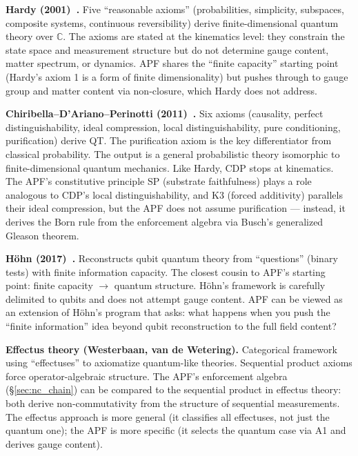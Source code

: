 \documentclass[11pt,a4paper]{article}
\theoremstyle{definition}
\begin{document}
\smallskip\noindent\textbf{Hardy (2001)~\cite{Hardy2001}.}\quad
Five ``reasonable axioms'' (probabilities, simplicity, subspaces,
composite systems, continuous reversibility) derive finite-dimensional
quantum theory over $\mathbb{C}$.  The axioms are stated at the
kinematics level: they constrain the state space and measurement
structure but do not determine gauge content, matter spectrum, or
dynamics.  APF shares the ``finite capacity'' starting point
(Hardy's axiom 1 is a form of finite dimensionality) but pushes
through to gauge group and matter content via non-closure, which
Hardy does not address.

\smallskip\noindent\textbf{Chiribella--D'Ariano--Perinotti
(2011)~\cite{CDP2011}.}\quad
Six axioms (causality, perfect distinguishability, ideal compression,
local distinguishability, pure conditioning, purification) derive QT.
The purification axiom is the key differentiator from classical
probability.  The output is a general probabilistic theory isomorphic
to finite-dimensional quantum mechanics.  Like Hardy, CDP stops at
kinematics.  The APF's constitutive principle SP (substrate faithfulness)
plays a role analogous to CDP's local distinguishability, and K3
(forced additivity) parallels their ideal compression, but the APF
does not assume purification --- instead, it derives the Born rule
from the enforcement algebra via Busch's generalized Gleason theorem.

\smallskip\noindent\textbf{H\"ohn (2017)~\cite{Hohn2017}.}\quad
Reconstructs qubit quantum theory from ``questions'' (binary tests)
with finite information capacity.  The closest cousin to APF's
starting point: finite capacity $\to$ quantum structure.  H\"ohn's
framework is carefully delimited to qubits and does not attempt gauge
content.  APF can be viewed as an extension of H\"ohn's program that
asks: what happens when you push the ``finite information'' idea beyond
qubit reconstruction to the full field content?

\smallskip\noindent\textbf{Effectus theory (Westerbaan, van de Wetering).}\quad
Categorical framework using ``effectuses'' to axiomatize quantum-like
theories.  Sequential product axioms force operator-algebraic structure.
The APF's enforcement algebra (\S\ref{sec:nc_chain}) can be compared
to the sequential product in effectus theory: both derive
non-commutativity from the structure of sequential measurements.  The
effectus approach is more general (it classifies all effectuses, not
just the quantum one); the APF is more specific (it selects the
quantum case via A1 and derives gauge content).
\end{document}
